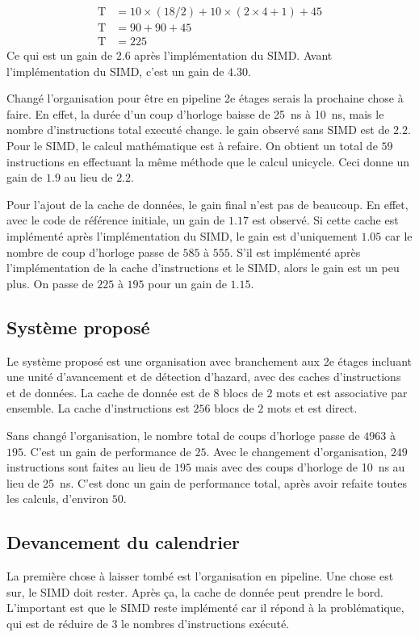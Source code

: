 \documentclass[a11paper]{article}
\newcommand{\todo}[1]{\begin{color}{Red}\textbf{TODO:} #1\end{color}}
\begin{document}
\begin{align}
  \text{T} &= 10\times(18/2) + 10\times(2\times4+1) + 45 \\
  \text{T} &= 90 + 90 + 45 \\
  \text{T} &= 225
\end{align}
Ce qui est un gain de $2.6$ après l'implémentation du SIMD. Avant
l'implémentation du SIMD, c'est un gain de $4.30$.

Changé l'organisation pour être en pipeline 2e étages serais la prochaine chose
à faire. En effet, la durée d'un coup d'horloge baisse de \SI{25}{\nano\s} à \SI{10}{\nano\s}, mais
le nombre d'instructions total executé change. le gain observé sans SIMD est de
$2.2$. Pour le SIMD, le calcul mathématique est à refaire. On obtient un total
de $59$ instructions en effectuant la même méthode que le calcul unicycle. Ceci
donne un gain de $1.9$ au lieu de $2.2$.

Pour l'ajout de la cache de données, le gain final n'est pas de beaucoup. En
effet, avec le code de référence initiale, un gain de $1.17$ est observé. Si
cette cache est implémenté après l'implémentation du SIMD, le gain est
d'uniquement $1.05$ car le nombre de coup d'horloge passe de $585$ à $555$.
S'il est implémenté après l'implémentation de la cache d'instructions et le
SIMD, alors le gain est un peu plus. On passe de $225$ à $195$ pour un gain
de $1.15$.

\subsection{Système proposé}
Le système proposé est une organisation avec branchement aux 2e étages incluant
une unité d'avancement et de détection d'hazard, avec des caches d'instructions
et de données. La cache de donnée est de $8$ blocs de $2$ mots et est
associative par ensemble. La cache d'instructions est $256$ blocs de $2$ mots
et est direct.

Sans changé l'organisation, le nombre total de coups d'horloge passe de $4963$
à $195$. C'est un gain de performance de $25$. Avec le changement
d'organisation, $249$ instructions sont faites au lieu de $195$ mais avec des
coups d'horloge de \SI{10}{\nano\s} au lieu de \SI{25}{\nano\s}. C'est donc un
gain de performance total, après avoir refaite toutes les calculs,
d'environ $50$.

\subsection{Devancement du calendrier}
La première chose à laisser tombé est l'organisation en pipeline. Une chose est
sur, le SIMD doit rester. Après ça, la cache de donnée peut prendre le bord.
L'important est que le SIMD reste implémenté car il répond à la problématique,
qui est de réduire de $3$ le nombres d'instructions exécuté.

\end{document}

